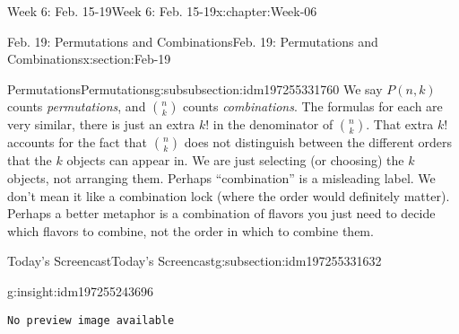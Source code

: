\documentclass[oneside,10pt,]{book}
\newcommand{\mono}[1]{\texttt{#1}}
\numberwithin{equation}{section}
\newlength{\qrsize}
\newlength{\previewwidth}
\begin{document}
\begin{chapterptx}{Week 6: Feb. 15-19}{}{Week 6: Feb. 15-19}{}{}{x:chapter:Week-06}
\begin{sectionptx}{Feb. 19: Permutations and Combinations}{}{Feb. 19: Permutations and Combinations}{}{}{x:section:Feb-19}
\begin{subsubsectionptx}{Permutations}{}{Permutations}{}{}{g:subsubsection:idm197255331760}
 We say \(P(n,k)\) counts \emph{permutations}, and \({n \choose k}\) counts \emph{combinations}. The formulas for each are very similar, there is just an extra \(k!\) in the denominator of \({n \choose k}\). That extra \(k!\) accounts for the fact that \({n \choose k}\) does not distinguish between the different orders that the \(k\) objects can appear in. We are just selecting (or choosing) the \(k\) objects, not arranging them. Perhaps ``combination'' is a misleading label. We don't mean it like a combination lock (where the order would definitely matter). Perhaps a better metaphor is a combination of flavors \textemdash{} you just need to decide which flavors to combine, not the order in which to combine them.%
\end{subsubsectionptx}
%
%
\typeout{************************************************}
\typeout{************************************************}
%
\begin{subsectionptx}{Today's Screencast}{}{Today's Screencast}{}{}{g:subsection:idm197255331632}
\begin{insight}{}{g:insight:idm197255243696}%
\setlength{\qrsize}{9em}
\setlength{\previewwidth}{\linewidth}
\addtolength{\previewwidth}{-\qrsize}
\begin{tcbraster}[raster columns=2, raster column skip=1pt, raster halign=center, raster force size=false, raster left skip=0pt, raster right skip=0pt]%
\begin{tcolorbox}[previewstyle, width=\previewwidth]%
\mono{No preview image available}%
\end{tcolorbox}%
\begin{tcolorbox}[qrstyle]%
[QR LINK]\end{tcolorbox}%
\end{tcbraster}%
\end{insight}
\end{subsectionptx}
\end{sectionptx}
\end{chapterptx}
%
%
\typeout{************************************************}
\typeout{************************************************}
%
\end{document}
